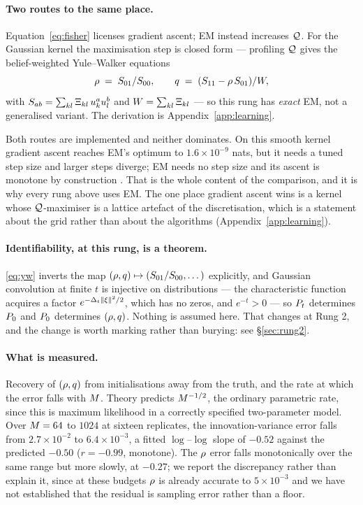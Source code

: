 \documentclass{article}
\begin{document}
\paragraph{Two routes to the same place.} Equation~\eqref{eq:fisher} licenses gradient ascent;
EM instead increases $\mathcal{Q}$. For the Gaussian kernel the maximisation step is closed form ---
profiling $\mathcal{Q}$ gives the belief-weighted Yule--Walker equations
\begin{equation}
\label{eq:yw}
\rho \;=\; S_{01}/S_{00},
\qquad
q \;=\; (S_{11} - \rho\,S_{01})/W ,
\end{equation}
with $S_{ab}=\sum_{kl}\Xi_{kl}\,u_{k}^{a}u_{l}^{b}$ and $W=\sum_{kl}\Xi_{kl}$ --- so
this rung has \emph{exact} EM, not a generalised variant. The derivation is
Appendix~\ref{app:learning}.

Both routes are implemented and neither dominates. On this smooth kernel gradient ascent reaches
EM's optimum to $1.6\times10^{-9}$ nats, but it needs a tuned step size and larger steps diverge;
EM needs no step size and its ascent is monotone by construction \citep{dempster1977,wu1983}.
That is the whole content of the comparison, and it is why every rung above uses EM. The one place
gradient ascent wins is a kernel whose $\mathcal{Q}$-maximiser is a lattice artefact of the
discretisation, which is a statement about the grid rather than about the algorithms
(Appendix~\ref{app:learning}).

\paragraph{Identifiability, at this rung, is a theorem.} \eqref{eq:yw} inverts the map
$(\rho,q)\mapsto(S_{01}/S_{00},\dots)$ explicitly, and Gaussian convolution at finite $t$ is
injective on distributions --- the characteristic function acquires a factor
$e^{-\Delta_t\|\xi\|^2/2}$, which has no zeros, and $e^{-t}>0$ --- so $P_t$ determines $P_0$ and
$P_0$ determines $(\rho,q)$. Nothing is assumed here. That changes at Rung 2, and the change
is worth marking rather than burying: see \S\ref{sec:rung2}.

\paragraph{What is measured.} Recovery of $(\rho,q)$ from initialisations away from the
truth, and the rate at which the error falls with $M$. Theory predicts $M^{-1/2}$, the
ordinary parametric rate, since this is maximum likelihood in a correctly specified
two-parameter model. Over $M=64$ to $1024$ at sixteen replicates, the innovation-variance
error falls from $2.7\times10^{-2}$ to $6.4\times10^{-3}$, a fitted $\log$--$\log$ slope of
$-0.52$ against the predicted $-0.50$ ($r=-0.99$, monotone). The $\rho$ error falls monotonically
over the same range but more slowly, at $-0.27$; we report the discrepancy rather than explain it,
since at these budgets $\rho$ is already accurate to $5\times10^{-3}$ and we have not established
that the residual is sampling error rather than a floor.
\end{document}
